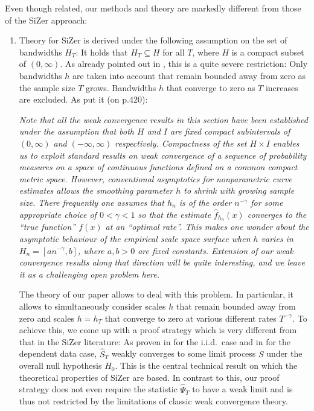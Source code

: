 \documentclass[a4paper,12pt]{article}
\begin{document}
Even though related, our methods and theory are markedly different from those of the SiZer approach:
\begin{enumerate}[label=(\roman*), leftmargin=0.8cm]

\item Theory for SiZer is derived under the following assumption on the set of bandwidths $H_T$: It holds that $H_T \subseteq H$ for all $T$, where $H$ is a compact subset of $(0,\infty)$. As already pointed out in \cite{ChaudhuriMarron2000}, this is a quite severe restriction: Only bandwidths $h$ are taken into account that remain bounded away from zero as the sample size $T$ grows. Bandwidths $h$ that converge to zero as $T$ increases are excluded.  As \cite{ChaudhuriMarron2000} put it (on p.420):
\vspace{0.15cm}

\begin{spacing}{1.1}
{\small \textit{Note that all the weak convergence results in this section have been established under the assumption that both $H$ and $I$ are fixed compact subintervals of $(0,\infty)$ and $(-\infty,\infty)$ respectively. Compactness of the set $H \times I$ enables us to exploit standard results on weak convergence of a sequence of probability measures on a space of continuous functions defined on a common compact metric space. However, conventional asymptotics for nonparametric curve estimates allows the smoothing parameter $h$ to shrink with growing sample size. There frequently one assumes that $h_n$ is of the order $n^{-\gamma}$ for some appropriate choice of $0 < \gamma < 1$ so that the estimate $\hat{f}_{h_n}(x)$ converges to the ``true function'' $f(x)$ at an ``optimal rate''. This makes one wonder about the asymptotic behaviour of the empirical scale space surface when $h$ varies in $H_n = [a n^{-\gamma},b]$, where $a,b > 0$ are fixed constants. Extension of our weak convergence results along that direction will be quite interesting, and we leave it as a challenging open problem here.} }
\end{spacing} 
\vspace{0.2cm}

The theory of our paper allows to deal with this problem. In particular, it allows to simultaneously consider scales $h$ that remain bounded away from zero and scales $h = h_T$ that converge to zero at various different rates $T^{-\gamma}$. To achieve this, we come up with a proof strategy which is very different from that in the SiZer literature:  As proven in \cite{ChaudhuriMarron2000} for the i.i.d.\ case and in \cite{ParkHannigKang2009} for the dependent data case, $\widehat{S}_T$ weakly converges to some limit process $S$ under the overall null hypothesis $H_0$. This is the central technical result on which the theoretical properties of SiZer are based. In contrast to this, our proof strategy does not even require the statistic $\widehat{\Psi}_T$ to have a weak limit and is thus not restricted by the limitations of classic weak convergence theory. 


\end{enumerate}
\end{document}
